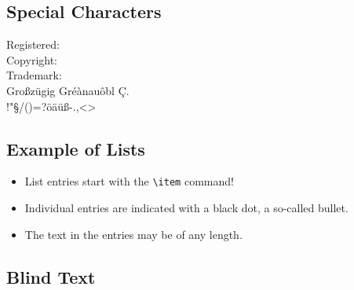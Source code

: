 \documentclass[class=scrbook, crop=false]{standalone}
\begin{document}
    \subsection{Special Characters}
    Registered: \TReg\\
    Copyright: \TCop\\
    Trademark: \TTra\\
    
    Großzügig Gréànauôbl Ç.\\
    !"§/()=?öäüß-.,<>\\
    
    \subsection{Example of Lists}
    \begin{itemize}
      \item List entries start with the \verb|\item| command!
      \item Individual entries are indicated with a black dot, a so-called bullet.
      \item The text in the entries may be of any length.
    \end{itemize}
    
    \subsection{Blind Text}
    \Blindtext
    
\end{document}
